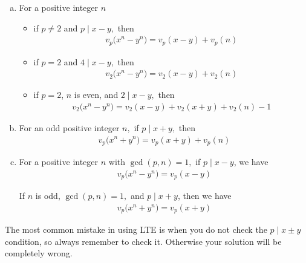 \documentclass[main.tex]{subfile}
\begin{document}
    \begin{enumerate}[(a)]
        \item  For a positive integer $n$
            \begin{itemize}
                \item if $p \neq 2$ and $p \mid x-y,$ then
                 \begin{align*}
                 v_p\big(  x^n - y^n \big) = v_p(  x - y ) + v_p(  n )
                 \end{align*}

                \item if $p=2$ and $4 \mid x-y,$ then
                \begin{align*}
                 v_2\big(  x^n - y^n \big) = v_2(  x-y ) + v_2(  n )
                \end{align*}

                \item if $p=2$, $n$ is even, and $2\mid x-y,$ then
                \begin{align*}
                v_2\big(  x^n - y^n \big) = v_2(  x - y )+v_2(  x + y )+v_2(  n )-1
                \end{align*}
            \end{itemize}

        \item For an odd positive integer $n,$ if $p \mid x+y,$ then
	            \begin{align*}
                 v_p\big(  x^n + y^n \big) = v_p(  x + y ) + v_p(  n )
                 \end{align*}

        \item For a positive integer $n$ with $\gcd(p,n)=1,$ if $p\mid x-y$, we have
         \begin{align*}
         v_p\big(  x^n - y^n \big) = v_p(  x - y )
         \end{align*}
        \par If $n$ is odd, $\gcd(p,n)=1,$ and $p\mid x+y$, then we have
		\begin{align*}
		v_p\big(  x^n + y^n \big) = v_p(  x + y )
		\end{align*}

    \end{enumerate}

    \begin{note}
        The most common mistake in using LTE is when you do not check the $p \mid x \pm y$ condition, so always remember to check it. Otherwise your solution will be completely wrong.
    \end{note}
\end{document}
